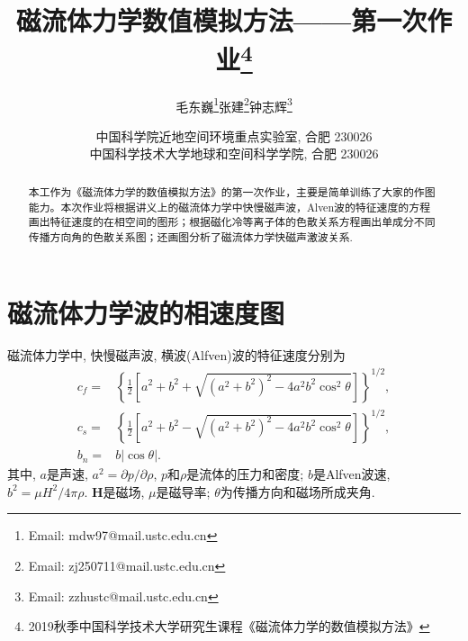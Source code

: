 \documentclass{article}
\begin{document}
	
	\renewcommand{\refname}{参考文献}
	\renewcommand{\figurename}{图}
	\renewcommand{\abstractname}{摘要}
	\def\due{2019年9月25日周三0:00}
	
	\title{磁流体力学数值模拟方法——第一次作业\footnote{2019秋季中国科学技术大学研究生课程《磁流体力学的数值模拟方法》}}
	
	
	\author{毛东巍\footnote{Email: mdw97@mail.ustc.edu.cn}\quad 张建\footnote{Email: zj250711@mail.ustc.edu.cn}\quad 钟志辉\footnote{Email: zzhustc@mail.ustc.edu.cn}}
	
	\date{%
		\scriptsize%
		中国科学院近地空间环境重点实验室, 合肥 230026\\
		中国科学技术大学地球和空间科学学院, 合肥 230026
	}
	
	\maketitle
	
	\begin{abstract}
		本工作为《磁流体力学的数值模拟方法》的第一次作业，主要是简单训练了大家的作图能力。本次作业将根据讲义上的磁流体力学中快慢磁声波，Alven波的特征速度的方程画出特征速度的在相空间的图形；根据磁化冷等离子体的色散关系方程画出单成分不同传播方向角的色散关系图；还画图分析了磁流体力学快磁声激波关系.
	\end{abstract}
	
	\section{磁流体力学波的相速度图}
	
	磁流体力学中, 快慢磁声波, 横波(Alfven)波的特征速度分别为\citep{Jeffrey1964}
	\begin{align}
		c_f =& \left\{\frac{1}{2} \left[a^2 + b^2 + \sqrt{(a^2 + b^2)^2 - 4 a^2 b^2
			\cos^2\theta}\right]\right\}^{1/2},
		\\
		c_s =& \left\{\frac{1}{2} \left[a^2 + b^2 - \sqrt{(a^2 + b^2)^2 - 4 a^2 b^2
			\cos^2\theta}\right]\right\}^{1/2},
		\\
		b_n =& b \left|\cos\theta\right|.
	\end{align}
	其中, $a$是声速, $a^2 = \partial p / \partial \rho$, $p$和$\rho$是流体的压力和密度;
	$b$是Alfven波速, $b^2 = \mu H^2 / 4 \pi \rho$. $\boldsymbol{H}$是磁场, $\mu$是磁导率;
	$\theta$为传播方向和磁场所成夹角.
	
\end{document}
